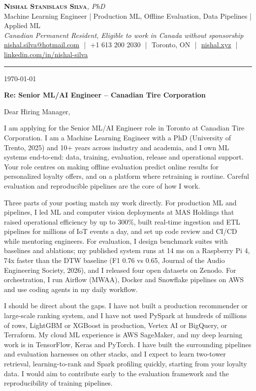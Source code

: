\documentclass[11pt]{article}
\makeatletter
\newcommand{\clName}{Nishal Stanislaus Silva}
\newcommand{\clEmail}{nishal.silva@hotmail.com}
\newcommand{\clPhone}{+1 613 200 2030}
\newcommand{\clCity}{Toronto, ON}
\newcommand{\clSite}{https://nishal.xyz}
\newcommand{\clLinkedIn}{https://www.linkedin.com/in/nishal-silva}
\newcommand{\clStatus}{Canadian Permanent Resident, Eligible to work in Canada without sponsorship}
\newcommand{\clTagline}{Machine Learning Engineer | Production ML, Offline Evaluation, Data Pipelines | Applied ML}
\newcommand{\clRole}{Senior ML/AI Engineer}
\newcommand{\clCompany}{Canadian Tire Corporation}
\newcommand{\clAddressee}{Dear Hiring Manager,}
\makeatother
\begin{document}
\pagestyle{empty}

\begin{center}
    {\LARGE \scshape \textbf{\clName}}{\large \textit{, PhD}}
    \\[1pt]
    {\small \clTagline}
    \\[1pt]
    {\footnotesize\textit{\clStatus}}
    \\[1pt]
    {\small
    \href{mailto:\clEmail}{\clEmail}
    \,\,|\,\, \clPhone
    \,\,|\,\, \clCity
    \,\,|\,\, \href{\clSite}{nishal.xyz}
    \,\,|\,\, \href{\clLinkedIn}{linkedin.com/in/nishal-silva}}
\end{center}

\rule{\linewidth}{0.4pt}\vspace{0.6em}

\today

\textbf{Re: \clRole{} -- \clCompany{}}

\clAddressee

I am applying for the Senior ML/AI Engineer role in Toronto at Canadian Tire Corporation. I am a Machine Learning Engineer with a PhD (University of Trento, 2025) and 10+ years across industry and academia, and I own ML systems end-to-end: data, training, evaluation, release and operational support. Your role centres on making offline evaluation predict online results for personalized loyalty offers, and on a platform where retraining is routine. Careful evaluation and reproducible pipelines are the core of how I work.

Three parts of your posting match my work directly. For production ML and pipelines, I led ML and computer vision deployments at MAS Holdings that raised operational efficiency by up to 300\%, built real-time ingestion and ETL pipelines for millions of IoT events a day, and set up code review and CI/CD while mentoring engineers. For evaluation, I design benchmark suites with baselines and ablations; my published system runs at 14 ms on a Raspberry Pi 4, 74x faster than the DTW baseline (F1 0.76 vs 0.65, Journal of the Audio Engineering Society, 2026), and I released four open datasets on Zenodo. For orchestration, I run Airflow (MWAA), Docker and Snowflake pipelines on AWS and use coding agents in my daily workflow.

I should be direct about the gaps. I have not built a production recommender or large-scale ranking system, and I have not used PySpark at hundreds of millions of rows, LightGBM or XGBoost in production, Vertex AI or BigQuery, or Terraform. My cloud ML experience is AWS SageMaker, and my deep learning work is in TensorFlow, Keras and PyTorch. I have built the surrounding pipelines and evaluation harnesses on other stacks, and I expect to learn two-tower retrieval, learning-to-rank and Spark profiling quickly, starting from your loyalty data. I would aim to contribute early to the evaluation framework and the reproducibility of training pipelines.
\end{document}
